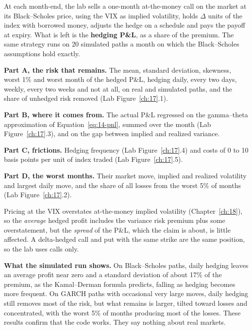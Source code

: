 At each month-end, the lab sells a one-month at-the-money call on the market at its Black--Scholes price, using the VIX as implied volatility, holds $\Delta$ units of the index with borrowed money, adjusts the hedge on a schedule and pays the payoff at expiry. What is left is the \textbf{hedging P\&L}, as a share of the premium. The same strategy runs on 20 simulated paths a month on which the Black--Scholes assumptions hold exactly.

\textbf{Part A, the risk that remains.} The mean, standard deviation, skewness, worst 1\% and worst month of the hedged P\&L, hedging daily, every two days, weekly, every two weeks and not at all, on real and simulated paths, and the share of unhedged risk removed (Lab Figure~\ref{ch:17}.1).

\textbf{Part B, where it comes from.} The actual P\&L regressed on the gamma--theta approximation of Equation~\eqref{eq:14-pnl}, summed over the month (Lab Figure~\ref{ch:17}.3), and on the gap between implied and realized variance.

\textbf{Part C, frictions.} Hedging frequency (Lab Figure~\ref{ch:17}.4) and costs of 0 to 10 basis points per unit of index traded (Lab Figure~\ref{ch:17}.5).

\textbf{Part D, the worst months.} Their market move, implied and realized volatility and largest daily move, and the share of all losses from the worst 5\% of months (Lab Figure~\ref{ch:17}.2).

Pricing at the VIX overstates at-the-money implied volatility (Chapter~\ref{ch:18}), so the \emph{average} hedged profit includes the variance risk premium plus some overstatement, but the \emph{spread} of the P\&L, which the claim is about, is little affected. A delta-hedged call and put with the same strike are the same position, so the lab uses calls only.

\textbf{What the simulated run shows.} On Black--Scholes paths, daily hedging leaves an average profit near zero and a standard deviation of about 17\% of the premium, as the Kamal--Derman formula predicts, falling as hedging becomes more frequent. On GARCH paths with occasional very large moves, daily hedging still removes most of the risk, but what remains is larger, tilted toward losses and concentrated, with the worst 5\% of months producing most of the losses. These results confirm that the code works. They say nothing about real markets.

